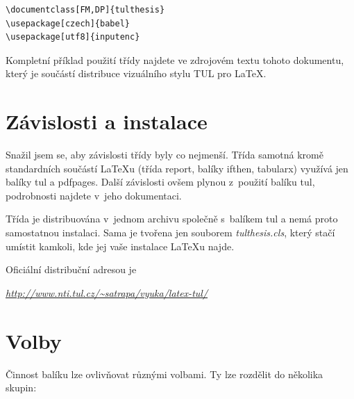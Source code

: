 \documentclass[FM,BP]{tulthesis}
\newcommand{\argument}[1]{{\ttfamily\color{\tulcolor}#1}}
\newenvironment{myquote}{\begin{list}{}{\setlength\leftmargin\parindent}\item[]}{\end{list}}
\newenvironment{listing}{\begin{myquote}\color{\tulcolor}}{\end{myquote}}
\begin{document}
\begin{listing}
\begin{verbatim}
\documentclass[FM,DP]{tulthesis}
\usepackage[czech]{babel}
\usepackage[utf8]{inputenc}
\end{verbatim}
\end{listing}

Kompletní příklad použití třídy najdete ve zdrojovém textu tohoto dokumentu,
který je součástí distribuce vizuálního stylu TUL pro \LaTeX.


\chapter{Závislosti a instalace}

Snažil jsem se, aby závislosti třídy byly co nejmenší. Třída samotná kromě
standardních součástí \LaTeX u (třída \argument{report}, balíky
\argument{ifthen}, \argument{tabularx}) využívá jen balíky \argument{tul} a
\argument{pdfpages}. Další závislosti ovšem plynou z~použití balíku
\argument{tul}, podrobnosti najdete v~jeho dokumentaci.

Třída je distribuována v~jednom archivu společně s~balíkem \argument{tul} a
nemá proto samostatnou instalaci. Sama je tvořena jen souborem
\emph{tulthesis.cls}, který stačí umístit kamkoli, kde jej vaše instalace
\LaTeX u najde. 

Oficiální distribuční adresou je

\begin{listing}
\href{http://www.nti.tul.cz/~satrapa/vyuka/latex-tul/}{\emph{http://www.nti.tul.cz/\textasciitilde satrapa/vyuka/latex-tul/}}
\end{listing}


\chapter{Volby}\label{volby}

Činnost balíku lze ovlivňovat různými volbami. Ty lze rozdělit do několika
skupin:
\end{document}

